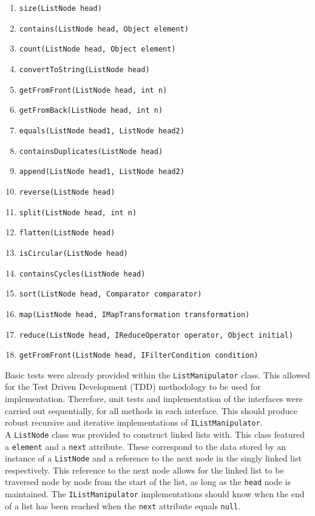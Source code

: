 \documentclass{article}
\begin{document}
\renewcommand{\labelenumi}{\roman{enumi}}
\begin{enumerate}
\itemsep0.2em
\item \verb+size(ListNode head)+
\item \verb+contains(ListNode head, Object element)+
\item \verb+count(ListNode head, Object element)+
\item \verb+convertToString(ListNode head)+
\item \verb+getFromFront(ListNode head, int n)+
\item \verb+getFromBack(ListNode head, int n)+
\item \verb+equals(ListNode head1, ListNode head2)+
\item \verb+containsDuplicates(ListNode head)+
\item \verb+append(ListNode head1, ListNode head2)+
\item \verb+reverse(ListNode head)+
\item \verb+split(ListNode head, int n)+
\item \verb+flatten(ListNode head)+
\item \verb+isCircular(ListNode head)+
\item \verb+containsCycles(ListNode head)+
\item \verb+sort(ListNode head, Comparator comparator)+
\item \verb+map(ListNode head, IMapTransformation transformation)+
\item \verb+reduce(ListNode head, IReduceOperator operator, Object initial)+
\item \verb+getFromFront(ListNode head, IFilterCondition condition)+
\end{enumerate}

\noindent Basic tests were already provided within the \verb+ListManipulator+ class. This allowed for the Test Driven Development (TDD) methodology to be used for implementation. Therefore, unit tests and implementation of the interfaces were carried out sequentially, for all methods in each interface. This should produce robust recursive and iterative implementations of \verb+IListManipulator+. \\

\noindent A \verb+ListNode+ class was provided to construct linked lists with. This class featured a \verb+element+ and a \verb+next+ attribute. These correspond to the data stored by an instance of a \verb+ListNode+ and a reference to the next node in the singly linked list respectively. This reference to the next node allows for the linked list to be traversed node by node from the start of the list, as long as the \verb+head+ node is maintained. The \verb+IListManipulator+ implementations should know when the end of a list has been reached when the \verb+next+ attribute equals \verb+null+.
\end{document}
